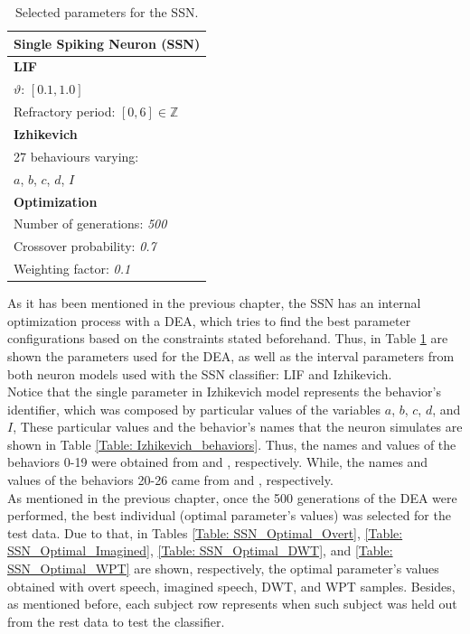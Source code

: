 \begin{table}[h!]
	\caption{Selected parameters for the SSN.}
	\centering
	\begin{tabular}{|l|}\hline
		\multicolumn{1}{|c|}{\textbf{Single Spiking Neuron (SSN)}}\\\hline
		\textbf{LIF}\\\hline
		$\vartheta$: $[0.1,1.0]$\\
		Refractory period: $[0,6] \in \mathbb{Z}$\\\hline
		\textbf{Izhikevich}\\\hline
		27 behaviours varying:\\
		$a$, $b$, $c$, $d$, $I$\\\hline
		\textbf{Optimization}\\\hline
		Number of generations: \textit{500}\\
		Crossover probability: \textit{0.7}\\
		Weighting factor: \textit{0.1}\\\hline
	\end{tabular}
	\label{Table: SSN_Parameters}
\end{table}

As it has been mentioned in the previous chapter, the SSN has an internal optimization process with a DEA, which tries to find the best parameter configurations based on the constraints stated beforehand. Thus, in Table \ref{Table: SSN_Parameters} are shown the parameters used for the DEA, as well as the interval parameters from both neuron models used with the SSN classifier: LIF and Izhikevich.\\

Notice that the single parameter in Izhikevich model represents the behavior's identifier, which was composed by particular values of the variables $a$, $b$, $c$, $d$, and $I$, These particular values and the behavior's names that the neuron simulates are shown in Table \ref{Table: Izhikevich_behaviors}. Thus, the names and values of the behaviors 0-19 were obtained from \cite{izhikevich2004model} and \cite{izhikevichweb1}, respectively. While,  the names and values of the behaviors 20-26 came from \cite{izhikevich2003simple} and \cite{izhikevichweb2}, respectively.\\

As mentioned in the previous chapter, once the 500 generations of the DEA were performed, the best individual (optimal parameter's values) was selected for the test data. Due to that, in Tables \ref{Table: SSN_Optimal_Overt}, \ref{Table: SSN_Optimal_Imagined}, \ref{Table: SSN_Optimal_DWT}, and \ref{Table: SSN_Optimal_WPT} are shown, respectively, the optimal parameter's values obtained with overt speech, imagined speech, DWT, and WPT samples. Besides, as mentioned before, each subject row represents when such subject was held out from the rest data to test the classifier.\\
\pagebreak

